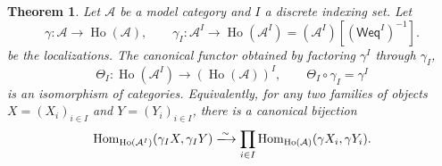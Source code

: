 \documentclass[10pt,a4paper]{amsart}
\theoremstyle{plain}
\newtheorem{theorem}{Theorem}[section]
\theoremstyle{definition}
\theoremstyle{remark}
\begin{document}
\begin{theorem}\label{thm:model-category-application}
  Let $\mathcal A$ be a model category and $I$ a discrete indexing set.
  Let
  \[
    \gamma:\mathcal A\longrightarrow\operatorname{Ho}(\mathcal A),
    \qquad
    \gamma_I:\mathcal A^I\longrightarrow
    \operatorname{Ho}(\mathcal A^I)
    =(\mathcal A^I)[(\mathsf{Weq}^I)^{-1}].
  \]
  be the localizations.
  The canonical functor obtained by factoring $\gamma^I$ through $\gamma_I$,
  \[
    \Theta_I:
    \operatorname{Ho}(\mathcal A^I)
    \longrightarrow(\operatorname{Ho}(\mathcal A))^I,
    \qquad
    \Theta_I\circ\gamma_I=\gamma^I
  \]
  is an isomorphism of categories.
  Equivalently, for any two families of objects $X=(X_i)_{i\in I}$ and $Y=(Y_i)_{i\in I}$, there is a canonical bijection
  \[
    \operatorname{Hom}_{\operatorname{Ho}(\mathcal A^I)}
    (\gamma_IX,\gamma_IY)
    \xlongrightarrow{\sim}
    \prod_{i\in I}
    \operatorname{Hom}_{\operatorname{Ho}(\mathcal A)}
    (\gamma X_i,\gamma Y_i).
  \]
\end{theorem}
\end{document}
